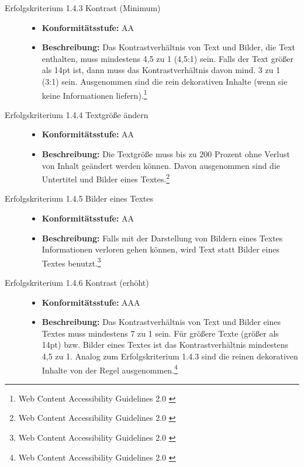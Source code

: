 \begin{description}
\begin{description}
		\item[Erfolgskriterium 1.4.3 Kontrast (Minimum)]\hfill
		\begin{itemize}
			\item \textbf{Konformitätsstufe:} AA
			\item \textbf{Beschreibung:} Das Kontrastverhältnis von Text und Bilder, die Text enthalten, muss mindestens 4,5 zu 1 (4,5:1) sein. Falls der Text größer 
			als 14pt ist, dann muss das Kontrastverhältnis davon mind. 3 zu 1 (3:1) sein. Ausgenommen sind die rein dekorativen Inhalte (wenn sie keine Informationen
			 liefern).\footnote{Web Content Accessibility Guidelines 2.0 \cite{WCAG2.0}}
		\end{itemize}
		
		\item[Erfolgskriterium 1.4.4 Textgröße ändern]\hfill
		\begin{itemize}
			\item \textbf{Konformitätsstufe:} AA
			\item \textbf{Beschreibung:} Die Textgröße muss bis zu 200 Prozent ohne Verlust von Inhalt geändert werden können. Davon ausgenommen sind die 
			Untertitel und Bilder eines Textes.\footnote{Web Content Accessibility Guidelines 2.0 \cite{WCAG2.0}}
		\end{itemize}
		
		\item[Erfolgskriterium 1.4.5 Bilder eines Textes]\hfill
		\begin{itemize}
			\item \textbf{Konformitätsstufe:} AA
			\item \textbf{Beschreibung:} Falls mit der Darstellung von Bildern eines Textes Informationen verloren gehen können, wird Text statt Bilder eines Textes 
			benutzt.\footnote{Web Content Accessibility Guidelines 2.0 \cite{WCAG2.0}}
		\end{itemize}
		
		\item[Erfolgskriterium 1.4.6 Kontrast (erhöht)]\hfill
		\begin{itemize}
			\item \textbf{Konformitätsstufe:} AAA
			\item \textbf{Beschreibung:} Das Kontrastverhältnis von Text und Bilder eines Textes muss mindestens 7 zu 1 sein. Für größere Texte (größer als 14pt) bzw. 
			Bilder eines Textes ist das Kontrastverhältnis mindestens 4,5 zu 1. Analog zum Erfolgskriterium 1.4.3 sind die reinen dekorativen Inhalte von 
			der Regel ausgenommen.\footnote{Web Content Accessibility Guidelines 2.0 \cite{WCAG2.0}}
		\end{itemize}
		

\end{description}
\end{description}
